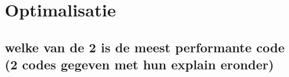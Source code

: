 \newpage

\section{Optimalisatie}

\subsection{welke van de 2 is de meest performante code (2 codes gegeven met hun explain eronder)}